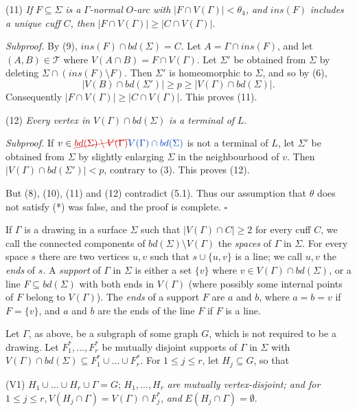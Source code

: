 \hspace*{12pt}(11) \textit{If} $F \subseteq \Sigma$ \textit{is a} $\Gamma$\textit{-normal} $O$\textit{-arc with} $|F \cap V(\Gamma)| < \theta_4$\textit{, and} $ins(F)$ \textit{includes a unique cuff} $C$\textit{, then} $|F \cap V(\Gamma)| \ge |C \cap V(\Gamma)|$.

\textit{Subproof.} By (9), $ins(F) \cap bd(\Sigma) = C$. Let $A = \Gamma \cap ins(F)$, and let $(A, B) \in \mathcal{T}$ where $V(A \cap B) = F \cap V(\Gamma)$. Let $\Sigma'$ be obtained from $\Sigma$ by deleting $\Sigma \cap (ins(F) \setminus F)$. Then $\Sigma'$ is homeomorphic to $\Sigma$, and so by (6),
\begin{equation*}
|V(B) \cap bd(\Sigma')| \ge p \ge |V(\Gamma) \cap bd(\Sigma)|.
\end{equation*}
Consequently $|F \cap V(\Gamma)| \ge |C \cap V(\Gamma)|$. This proves (11).

\hspace*{12pt}(12) \textit{Every vertex in} $V(\Gamma) \cap bd(\Sigma)$ \textit{is a terminal of} $L$.

\textit{Subproof.} If $v \in \delm{bd(\Sigma) \setminus V(\Gamma)}\fix{V(\Gamma) \cap bd(\Sigma)}$ is not a terminal of $L$, let $\Sigma'$ be obtained from $\Sigma$ by slightly enlarging $\Sigma$ in the neighbourhood of $v$. Then $|V(\Gamma) \cap bd(\Sigma')| < p$, contrary to (3). This proves (12).

But (8), (10), (11) and (12) contradict (5.1). Thus our assumption that $\theta$ does not satisfy (*) was false, and the proof is complete. $\square$


If $\Gamma$ is a drawing in a surface $\Sigma$ such that $|V(\Gamma) \cap C| \ge 2$ for every cuff $C$, we call the connected components of $bd(\Sigma) \setminus V(\Gamma)$ the \textit{spaces} of $\Gamma$ in $\Sigma$. For every space $s$ there are two vertices $u, v$ such that $s \cup \{u, v\}$ is a line; we call $u, v$ the \textit{ends} of $s$. A \textit{support} of $\Gamma$ in $\Sigma$ is either a set $\{v\}$ where $v \in V(\Gamma) \cap bd(\Sigma)$, or a line $F \subseteq bd(\Sigma)$ with both ends in $V(\Gamma)$ (where possibly some internal points of $F$ belong to $V(\Gamma)$). The \textit{ends} of a support $F$ are $a$ and $b$, where $a = b = v$ if $F = \{v\}$, and $a$ and $b$ are the ends of the line $F$ if $F$ is a line.

Let $\Gamma$, as above, be a subgraph of some graph $G$, which is not required to be a drawing. Let $F_1^*, \dots, F_r^*$ be mutually disjoint supports of $\Gamma$ in $\Sigma$ with $V(\Gamma) \cap bd(\Sigma) \subseteq F_1^* \cup \dots \cup F_r^*$. For $1 \le j \le r$, let $H_j \subseteq G$, so that

\hspace*{12pt}(V1) $H_1 \cup \dots \cup H_r \cup \Gamma = G$; $H_1, \dots, H_r$ \textit{are mutually vertex-disjoint; and for} $1 \le j \le r, V(H_j \cap \Gamma) = V(\Gamma) \cap F_j^*$, \textit{and} $E(H_j \cap \Gamma) = \emptyset$.
